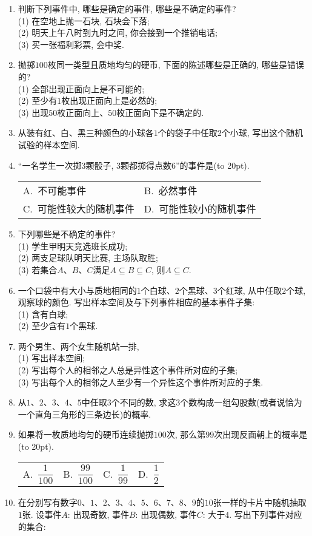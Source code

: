 \documentclass[10pt,a4paper]{article}
\newcommand{\bracket}[1]{(\hbox to #1pt{})}
\newcommand{\twoch}[4]{\par\begin{tabular}{p{.46\textwidth}p{.46\textwidth}}
A.~#1& B.~#2\\
C.~#3& D.~#4
\end{tabular}}
\newcommand{\fourch}[4]{\par\begin{tabular}{p{.23\textwidth}p{.23\textwidth}p{.23\textwidth}p{.23\textwidth}}
A.~#1 &B.~#2& C.~#3& D.~#4
\end{tabular}}
\begin{document}
\begin{enumerate}[1.]
\begin{center}
\end{center}
\item 判断下列事件中, 哪些是确定的事件, 哪些是不确定的事件?\\
(1) 在空地上抛一石块, 石块会下落;\\
(2) 明天上午八时到九时之间, 你会接到一个推销电话;\\
(3) 买一张福利彩票, 会中奖.
\item 抛掷$100$枚同一类型且质地均匀的硬币, 下面的陈述哪些是正确的, 哪些是错误的?\\
(1) 全部出现正面向上是不可能的;\\
(2) 至少有$1$枚出现正面向上是必然的;\\
(3) 出现$50$枚正面向上、$50$枚正面向下是不确定的.
\item 从装有红、白、黑三种颜色的小球各$1$个的袋子中任取$2$个小球, 写出这个随机试验的样本空间.
\item ``一名学生一次掷$3$颗骰子, $3$颗都掷得点数$6$''的事件是\bracket{20}.
\twoch{不可能事件}{必然事件}{可能性较大的随机事件}{可能性较小的随机事件}
\item 下列哪些是不确定的事件?\\
(1) 学生甲明天竞选班长成功;\\
(2) 两支足球队明天比赛, 主场队取胜;\\
(3) 若集合$A$、$B$、$C$满足$A\subseteq B\subseteq C$, 则$A\subseteq C$.
\item 一个口袋中有大小与质地相同的$1$个白球、$2$个黑球、$3$个红球, 从中任取$2$个球, 观察球的颜色. 写出样本空间及与下列事件相应的基本事件子集:\\
(1) 含有白球;\\
(2) 至少含有$1$个黑球.
\item 两个男生、两个女生随机站一排,\\
(1) 写出样本空间;\\
(2) 写出每个人的相邻之人总是异性这个事件所对应的子集;\\
(3) 写出每个人的相邻之人至少有一个异性这个事件所对应的子集.
\item 从$1$、$2$、$3$、$4$、$5$中任取$3$个不同的数, 求这$3$个数构成一组勾股数(或者说恰为一个直角三角形的三条边长)的概率.
\item 如果将一枚质地均匀的硬币连续抛掷$100$次, 那么第$99$次出现反面朝上的概率是\bracket{20}.
\fourch{$\dfrac 1{100}$}{$\dfrac{99}{100}$}{$\dfrac{1}{99}$}{$\dfrac 12$}
\item 在分别写有数字$0$、$1$、$2$、$3$、$4$、$5$、$6$、$7$、$8$、$9$的$10$张一样的卡片中随机抽取$1$张. 设事件$A$: 出现奇数, 事件$B$: 出现偶数, 事件$C$: 大于$4$. 写出下列事件对应的集合:\\

\end{enumerate}
\end{document}
